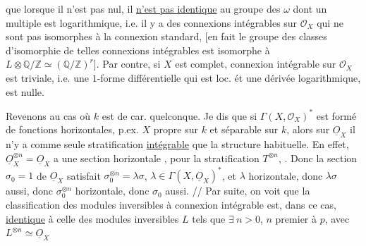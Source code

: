 

que lorsque il n'est pas nul, il \uline{n'est pas identique} au groupe des $\omega$ dont un multiple est logarithmique, i.e. il y a des  connexions intégrables sur $\mathcal O_X$ qui ne sont pas isomorphes à la connexion standard, [en fait le groupe des classes d'isomorphie de telles connexions intégrables est isomorphe à  $L\otimes\mathbb Q/\mathbb Z\simeq(\mathbb Q/\mathbb Z)^{r}$]. Par contre, si $X$ est complet,   connexion intégrable sur $\mathcal O_X$ est triviale, i.e. une $1$-forme différentielle qui est loc. ét une dérivée logarithmique, est nulle. 

Revenons au cas où $k$ est de car. quelconque. Je dis que si $\Gamma(X,\mathcal O_X)^{*}$ est formé de fonctions horizontales,  p.ex. $X$ propre sur $k$ et séparable sur $k$, alors sur $\underline O_X$ il n'y a comme seule  stratification \uline{intégrable} que la structure habituelle. En effet, $\underline O_X^{\otimes n}=\underline O_X$  a une section horizontale ,  pour la stratification $T^{\otimes n}$, . Donc la section $\sigma_0=1$ de $\underline O_X$ satisfait $\sigma_0^{\otimes n}=\lambda\sigma$, $\lambda\in\Gamma(X,\underline O_X)^{*}$,  et $\lambda$ horizontale,  donc $\lambda\sigma$ aussi, donc $\sigma_0^{\otimes n}$ horizontale, donc $\sigma_0$ aussi. // Par suite, on voit que la classification des  modules inversibles à connexion intégrable est, dans ce cas, \uline{identique} à celle des modules inversibles  $L$ tels que $\exists\ n>0$, $n$ premier à $p$, avec $L^{\otimes n}\simeq\underline O_X$

